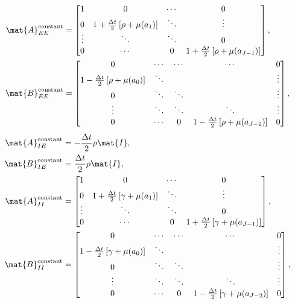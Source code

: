 \documentclass{jpmarticle}
\begin{document}
\begin{equation}
  \begin{split}
    \mat{A}_{EE}^{\text{constant}} &=
    \begin{bmatrix}
      1 & 0 & \cdots & 0
      \\
      0 & 1 + \frac{\Delta t}{2} \left[\rho + \mu(a_1)\right] &
      \ddots & \vdots
      \\
      \vdots & \ddots & \ddots & 0
      \\
      0 & \cdots & 0 &
      1 + \frac{\Delta t}{2} \left[\rho + \mu(a_{J - 1})\right]
    \end{bmatrix},
    \\
    \mat{B}_{EE}^{\text{constant}} &=
    \begin{bmatrix}
      0 & \cdots & \cdots & \cdots & 0
      \\
      1 - \frac{\Delta t}{2} \left[\rho + \mu(a_0)\right] & \ddots &
      & & \vdots
      \\
      0 & \ddots & \ddots & & \vdots
      \\
      \vdots & \ddots & \ddots & \ddots & \vdots
      \\
      0 & \cdots & 0 &
      1 - \frac{\Delta t}{2} \left[\rho + \mu(a_{J - 2})\right] & 0
    \end{bmatrix},
  \end{split}
\end{equation}
\begin{equation}
  \begin{split}
    \mat{A}_{IE}^{\text{constant}} &=
    - \frac{\Delta t}{2} \rho \mat{I},
    \\
    \mat{B}_{IE}^{\text{constant}} &=
    \frac{\Delta t}{2} \rho \mat{I},
    \\
    \mat{A}_{II}^{\text{constant}} &=
    \begin{bmatrix}
      1 & 0 & \cdots & 0
      \\
      0 & 1 + \frac{\Delta t}{2} \left[\gamma + \mu(a_1)\right] &
      \ddots & \vdots
      \\
      \vdots & \ddots & \ddots & 0
      \\
      0 & \cdots & 0 &
      1 + \frac{\Delta t}{2} \left[\gamma + \mu(a_{J - 1})\right]
    \end{bmatrix},
    \\
    \mat{B}_{II}^{\text{constant}} &=
    \begin{bmatrix}
      0 & \cdots & \cdots & \cdots & 0
      \\
      1 - \frac{\Delta t}{2} \left[\gamma + \mu(a_0)\right] & \ddots &
      & & \vdots
      \\
      0 & \ddots & \ddots & & \vdots
      \\
      \vdots & \ddots & \ddots & \ddots & \vdots
      \\
      0 & \cdots & 0 &
      1 - \frac{\Delta t}{2} \left[\gamma + \mu(a_{J - 2})\right] & 0
    \end{bmatrix},
  \end{split}
\end{equation}
\end{document}
